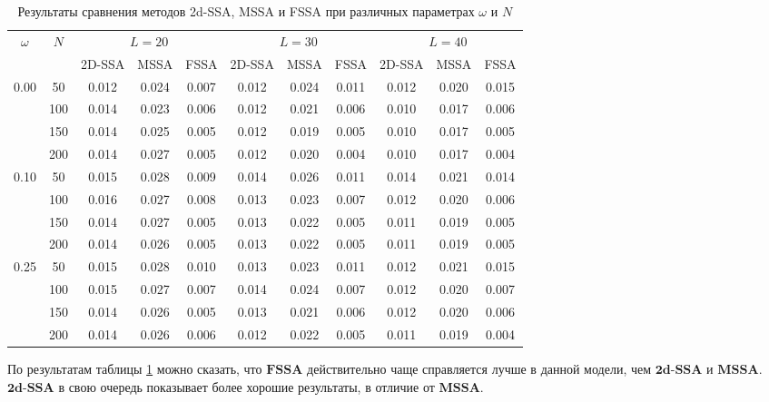 \documentclass[a4paper, 11pt]{article}
\newcommand{\MSSA}{\textbf{MSSA}}
\newcommand{\FSSA}{\textbf{FSSA}}
\newcommand{\DSSA}{\textbf{2d-SSA}}
\begin{document}
\begin{table}[H]
\caption{Результаты сравнения методов 2d-SSA, MSSA и FSSA при различных параметрах $\omega$ и $N$}
\centering
\label{tab:sim_fssa}
\begin{tabular}{c|c|ccc|ccc|ccc}
\toprule
\multicolumn{1}{c|}{$\omega$} & \multicolumn{1}{c|}{$N$} & \multicolumn{3}{c|}{$L=20$} & \multicolumn{3}{c|}{$L=30$} & \multicolumn{3}{c}{$L=40$} \\
 & & 2D-SSA & MSSA & FSSA & 2D-SSA & MSSA & FSSA & 2D-SSA & MSSA & FSSA \\
\midrule
\multirow{4}{*}{0.00} & 50 & 0.012 & 0.024 & 0.007 & 0.012 & 0.024 & 0.011 & 0.012 & 0.020 & 0.015 \\
 & 100 & 0.014 & 0.023 & 0.006 & 0.012 & 0.021 & 0.006 & 0.010 & 0.017 & 0.006 \\
 & 150 & 0.014 & 0.025 & 0.005 & 0.012 & 0.019 & 0.005 & 0.010 & 0.017 & 0.005 \\
 & 200 & 0.014 & 0.027 & 0.005 & 0.012 & 0.020 & 0.004 & 0.010 & 0.017 & 0.004 \\
\midrule
\multirow{4}{*}{0.10} & 50 & 0.015 & 0.028 & 0.009 & 0.014 & 0.026 & 0.011 & 0.014 & 0.021 & 0.014 \\
 & 100 & 0.016 & 0.027 & 0.008 & 0.013 & 0.023 & 0.007 & 0.012 & 0.020 & 0.006 \\
 & 150 & 0.014 & 0.027 & 0.005 & 0.013 & 0.022 & 0.005 & 0.011 & 0.019 & 0.005 \\
 & 200 & 0.014 & 0.026 & 0.005 & 0.013 & 0.022 & 0.005 & 0.011 & 0.019 & 0.005 \\
\midrule
\multirow{4}{*}{0.25} & 50 & 0.015 & 0.028 & 0.010 & 0.013 & 0.023 & 0.011 & 0.012 & 0.021 & 0.015 \\
 & 100 & 0.015 & 0.027 & 0.007 & 0.014 & 0.024 & 0.007 & 0.012 & 0.020 & 0.007 \\
 & 150 & 0.014 & 0.026 & 0.005 & 0.013 & 0.021 & 0.006 & 0.012 & 0.020 & 0.006 \\
 & 200 & 0.014 & 0.026 & 0.006 & 0.012 & 0.022 & 0.005 & 0.011 & 0.019 & 0.004 \\
\bottomrule
\end{tabular}
\end{table}


По результатам таблицы \ref{tab:sim_fssa} можно сказать, что $\FSSA$ действительно чаще справляется лучше в данной модели, чем $\DSSA$ и $\MSSA$. $\DSSA$ в свою очередь показывает более хорошие результаты, в отличие от $\MSSA$.
\end{document}

